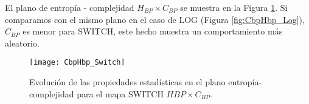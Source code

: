 El plano de entropía - complejidad $H_{BP} \times C_{BP}$ se muestra en la Figura \ref{fig:SWITCH_HC}.
Si comparamos con el mismo plano en el caso de LOG (Figura \ref{fig:CbpHbp_Log}), $C_{BP}$ es menor para SWITCH, este hecho muestra un comportamiento más aleatorio.
%
\begin{figure}[htpb]
	\centering
	\texttt{[image: CbpHbp\_Switch]}
	\caption{Evolución de las propiedades estadísticas en el plano entropía-complejidad para el mapa SWITCH $H{BP} \times C_{BP}$.}
	\label{fig:SWITCH_HC}
\end{figure}